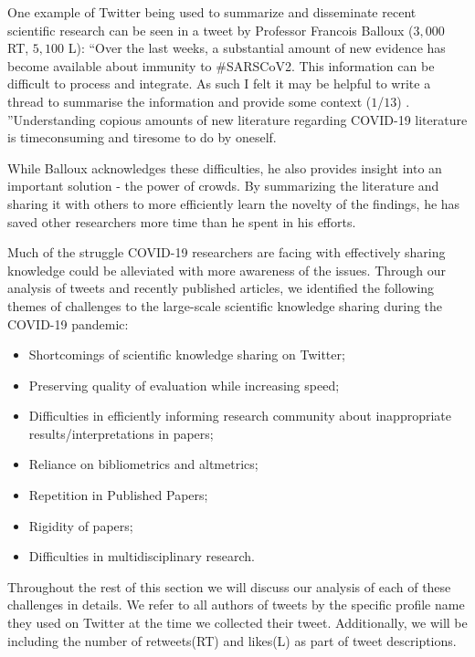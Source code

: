 \documentclass[acmsmall,authordraft]{acmart}
\begin{document}
One example of Twitter being used to summarize and disseminate recent scientific research can be seen in a tweet by Professor Francois Balloux ($3,000$ RT, $5,100$ L):
``Over the last weeks, a substantial amount of new evidence has become available about immunity to \#SARSCoV2. This information can be difficult to process and integrate. As such I felt it may be helpful to write a thread to summarise the information and provide some context ($1$/$13$) \citep{balloux_2020}. ''Understanding copious amounts of new literature regarding COVID-19 literature is timeconsuming and tiresome to do by oneself.

While Balloux acknowledges these difficulties, he also provides insight into an important solution - the power of crowds. By summarizing the literature and sharing it with others to more efficiently learn the novelty of the findings, he has saved other researchers more time than he spent in his efforts. 

Much of the struggle COVID-19 researchers are facing with effectively sharing knowledge could be alleviated with more awareness of the issues. Through our analysis of tweets and recently published articles, we identified the following themes of challenges to the large-scale scientific knowledge sharing during the COVID-19 pandemic:

\begin{itemize}
    \item Shortcomings of scientific knowledge sharing on Twitter;
    \item Preserving quality of evaluation while increasing speed;
    \item Difficulties in efficiently informing research community about inappropriate results/interpretations in papers;
    \item Reliance on bibliometrics and altmetrics;
    \item Repetition in Published Papers;
    \item Rigidity of papers;
    \item Difficulties in multidisciplinary research.
\end{itemize}

Throughout the rest of this section we will discuss our analysis of each of these challenges in details. We refer to all authors of tweets by the specific profile name they used on Twitter at the time we collected their tweet. Additionally, we will be including the number of retweets(RT) and likes(L) as part of tweet descriptions. 
\end{document}
